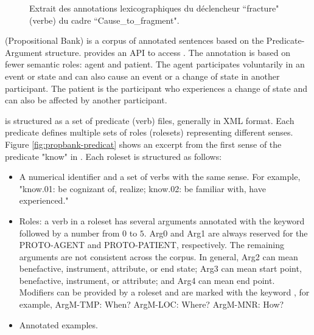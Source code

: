 \documentclass{KBook}
\begin{document}
\begin{figure}[ht]
	\caption[Extrait des annotations lexicographiques dans FrameNet.]{Extrait des annotations lexicographiques du déclencheur ``fracture" (verbe) du cadre ``Cause\_to\_fragment".}
	\label{fig:framenet-lex}
\end{figure}

 (Propositional Bank) is a corpus of annotated sentences based on the Predicate-Argument structure.  provides an API to access . The annotation is based on fewer semantic roles: agent and patient. The agent participates voluntarily in an event or state and can also cause an event or a change of state in another participant. The patient is the participant who experiences a change of state and can also be affected by another participant.

 is structured as a set of predicate (verb) files, generally in XML format. Each predicate defines multiple sets of roles (rolesets) representing different senses. Figure \ref{fig:propbank-predicat} shows an excerpt from the first sense of the predicate "know" in . Each roleset is structured as follows:
\begin{itemize}
	\item A numerical identifier and a set of verbs with the same sense. For example, "know.01: be cognizant of, realize; know.02: be familiar with, have experienced."
	\item Roles: a verb in a roleset has several arguments annotated with the keyword  followed by a number from $0$ to $5$. Arg0 and Arg1 are always reserved for the PROTO-AGENT and PROTO-PATIENT, respectively. The remaining arguments are not consistent across the corpus. In general, Arg2 can mean benefactive, instrument, attribute, or end state; Arg3 can mean start point, benefactive, instrument, or attribute; and Arg4 can mean end point. Modifiers can be provided by a roleset and are marked with the keyword , for example, ArgM-TMP: When? ArgM-LOC: Where? ArgM-MNR: How?
	\item Annotated examples.
\end{itemize}
\end{document}
